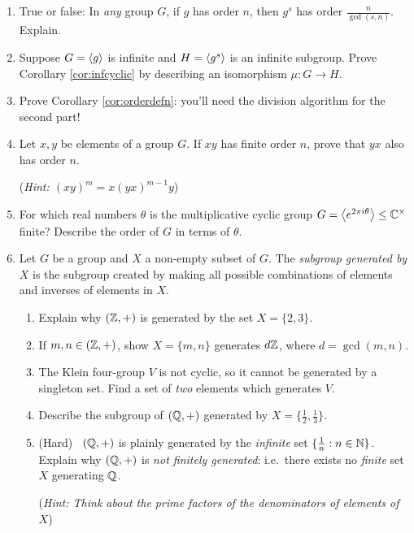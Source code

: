 \begin{exercises}
\begin{enumerate}
	  
	  \item True or false: In \emph{any} group $G$, if $g$ has order $n$, then $g^s$ has order $\frac n{\gcd(s,n)}$. Explain.
	  
	  
	  \item Suppose $G=\left\langle g\right\rangle$ is infinite and $H=\left\langle g^s\right\rangle$ is an infinite subgroup. Prove Corollary \ref{cor:infcyclic} by describing an isomorphism $\mu:G\to H$.
	
	
	  \item Prove Corollary \ref{cor:orderdefn}: you'll need the division algorithm for the second part!
	  
	  
		\item Let $x,y$ be elements of a group $G$. If $xy$ has finite order $n$, prove that $yx$ also has order $n$.\par
		(\emph{Hint: $(xy)^m=x(yx)^{m-1}y$})
		
		
		\item For which real numbers $\theta$ is the multiplicative cyclic group $G=\left\langle e^{2\pi i\theta}\right\rangle\le\mathbb{C}^\times$ finite? Describe the order of $G$ in terms of $\theta$.
		

		
		
		\item\label{exs:finitegen} Let $G$ be a group and $X$ a non-empty subset of $G$. The \emph{subgroup generated by $X$} is the subgroup created by making all possible combinations of elements and inverses of elements in $X$.
		\begin{enumerate}
		  \item Explain why $(\mathbb{Z},+)$ is generated by the set $X=\{2,3\}$.
		  \item If $m,n\in(\mathbb{Z},+)$, show $X=\{m,n\}$ generates $d\mathbb{Z}$, where $d=\gcd(m,n)$.
		  \item The Klein four-group $V$ is not cyclic, so it cannot be generated by a singleton set. Find a set of \emph{two} elements which generates $V$.
		  \item Describe the subgroup of $(\mathbb{Q},+)$ generated by $X=\{\frac 12,\frac 13\}$.
		  \item (Hard) \ $(\mathbb{Q},+)$ is plainly generated by the \emph{infinite} set $\{\frac 1n:n\in\mathbb{N}\}$. Explain why $(\mathbb{Q},+)$ is \emph{not finitely generated}: i.e.\ there exists no \emph{finite} set $X$ generating $\mathbb{Q}$.\par
		  (\emph{Hint: Think about the prime factors of the denominators of elements of $X$})
		\end{enumerate}


\end{enumerate}
\end{exercises}
